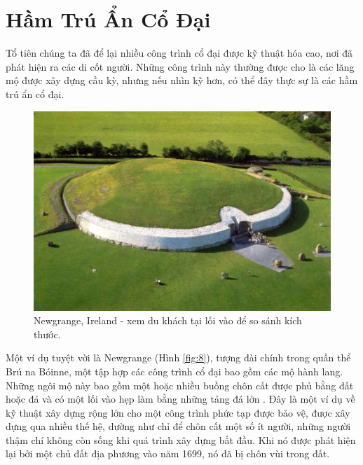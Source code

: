 \documentclass[10pt,twocolumn,letterpaper]{article}
\begin{document}
\section{Hầm Trú Ẩn Cổ Đại}

Tổ tiên chúng ta đã để lại nhiều công trình cổ đại được kỹ thuật hóa cao, nơi đã phát hiện ra các di cốt người. Những công trình này thường được cho là các lăng mộ được xây dựng cầu kỳ, nhưng nếu nhìn kỹ hơn, có thể đây thực sự là các hầm trú ẩn cổ đại.

\begin{figure}[b]
\begin{center}
   \includegraphics[width=1\linewidth]{ww19.jpg}
\end{center}
   \caption{Newgrange, Ireland - xem du khách tại lối vào để so sánh kích thước.}
\label{fig:8}
\label{fig:onecol}
\end{figure}

Một ví dụ tuyệt vời là Newgrange (Hình \ref{fig:8}), tượng đài chính trong quần thể Brú na Bóinne, một tập hợp các công trình cổ đại bao gồm các mộ hành lang. Những ngôi mộ này bao gồm một hoặc nhiều buồng chôn cất được phủ bằng đất hoặc đá và có một lối vào hẹp làm bằng những tảng đá lớn \cite{70}. Đây là một ví dụ về kỹ thuật xây dựng rộng lớn cho một công trình phức tạp được bảo vệ, được xây dựng qua nhiều thế hệ, dường như chỉ để chôn cất một số ít người, những người thậm chí không còn sống khi quá trình xây dựng bắt đầu. Khi nó được phát hiện lại bởi một chủ đất địa phương vào năm 1699, nó đã bị chôn vùi trong đất.
\end{document}
